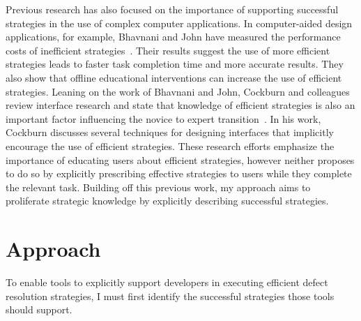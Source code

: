 \documentclass{sig-alternate}
\begin{document}
Previous research has also focused on the importance of supporting successful strategies in the use of complex computer applications.
In computer-aided design applications, for example, Bhavnani and John have measured the performance costs of inefficient strategies~\cite{Bhavnani2000}.
Their results suggest the use of more efficient strategies leads to faster task completion time and more accurate results.
They also show that offline educational interventions can increase the use of efficient strategies.
Leaning on the work of Bhavnani and John, Cockburn and colleagues review interface research and state that knowledge of efficient strategies is also an important factor influencing the novice to expert transition~\cite{Cockburn2014}.
In his work, Cockburn discusses several techniques for designing interfaces that implicitly encourage the use of efficient strategies.
These research efforts emphasize the importance of educating users about efficient strategies, however neither proposes to do so by explicitly prescribing effective strategies to users while they complete the relevant task.
Building off this previous work, my approach aims to proliferate strategic knowledge by explicitly describing successful strategies. 








 
 



\section{Approach}
\label{sec:approach}
To enable tools to explicitly support developers in executing efficient defect resolution strategies, I must first identify the successful strategies those tools should support. 
\end{document}
